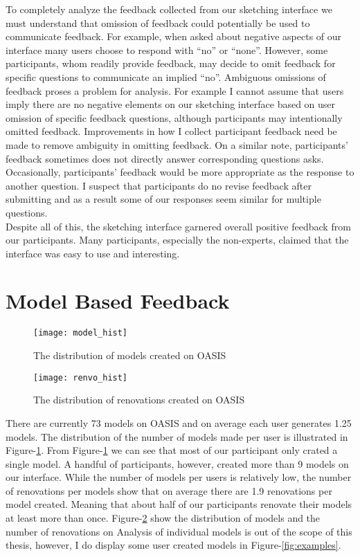 To completely analyze the feedback collected from our sketching interface we must understand that omission of feedback could potentially be used to communicate feedback.
For example, when asked about negative aspects of our interface many users choose to respond with ``no'' or ``none''.
However, some participants, whom readily provide feedback, may decide to omit feedback for specific questions to communicate an implied ``no''.
Ambiguous omissions of feedback proses a problem for analysis. 
For example I cannot assume that users imply there are no negative elements on our sketching interface based on user omission of specific feedback questions, although participants may intentionally omitted feedback.
Improvements in how I collect participant feedback need be made to remove ambiguity in omitting feedback.
On a similar note, participants' feedback sometimes does not directly answer corresponding questions asks.
Occasionally, participants' feedback would be more appropriate as the response to another question.
I suspect that participants do no revise feedback after submitting and as a result some of our responses seem similar for multiple questions. \\

Despite all of this, the sketching interface garnered overall positive feedback from our participants.
Many participants, especially the non-experts, claimed that the interface was easy to use and interesting.
 
\section{Model Based Feedback}

\begin{figure}[h]
	\centering
	\texttt{[image: model\_hist]}
	\caption{The distribution of models created on OASIS}
	\label{fig:model_hist}
\end{figure}


\begin{figure}[h]
	\centering
	\texttt{[image: renvo\_hist]}
	\caption{The distribution of renovations created on OASIS}
	\label{fig:renvo_hist}
\end{figure}

There are currently 73 models on OASIS and on average each user generates 1.25 models.
The distribution of the number of models made per user is illustrated in Figure-\ref{fig:model_hist}.
From Figure-\ref{fig:model_hist} we can see that most of our participant only crated a single model.
A handful of participants, however, created more than 9 models on our interface.
While the number of models per users is relatively low, the number of renovations per models show that on average there are 1.9 renovations per model created.
Meaning that about half of our participants renovate their models at least more than once.
Figure-\ref{fig:renvo_hist} show the distribution of models and the number of renovations on %
Analysis of individual models is out of the scope of this thesis, however, I do display some user created models in Figure-\ref{fig:examples}. \\

